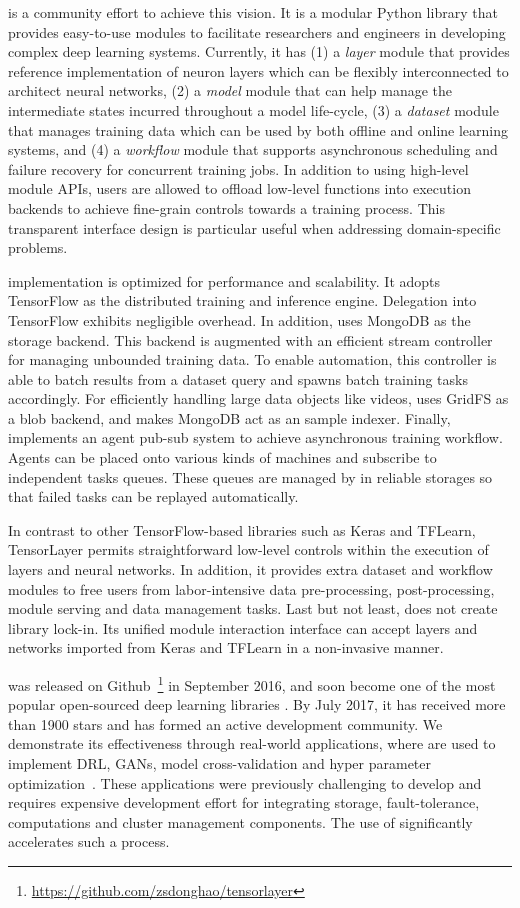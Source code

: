 \tl is a community effort to achieve this vision. It is a modular
Python library that provides easy-to-use modules to facilitate researchers
and engineers in developing complex deep learning systems. Currently, it has 
(1) a \emph{layer} module that provides reference implementation of neuron layers 
which can be flexibly interconnected to architect neural networks,
(2) a \emph{model} module that can help manage the intermediate states incurred throughout a model life-cycle,
(3) a \emph{dataset} module that manages training data which can be used by both offline and online learning systems, 
and (4) a \emph{workflow} module that supports asynchronous scheduling and failure recovery for concurrent training jobs.
In addition to using high-level module APIs, \tl users are allowed to offload low-level functions
into execution backends to achieve fine-grain controls towards a training process. This transparent interface design is 
particular useful when addressing domain-specific problems. 

\tl implementation is optimized for performance and scalability. It adopts TensorFlow as the distributed training and inference engine. 
Delegation into TensorFlow exhibits negligible overhead. In addition, \tl uses MongoDB as the storage backend.
This backend is augmented with an efficient stream controller
for managing unbounded training data.  
To enable automation, this controller is able to 
batch results from a dataset query 
and spawns batch training tasks accordingly. 
For efficiently handling large data objects like videos, \tl uses GridFS as a blob backend, and makes
MongoDB act as an sample indexer. Finally, \tl implements
an agent pub-sub system to achieve asynchronous training workflow. Agents
can be placed onto various kinds of machines and
subscribe to independent tasks queues.
These queues are managed by in reliable storages so that failed tasks can be replayed automatically.

In contrast to other TensorFlow-based libraries such as Keras and TFLearn, 
TensorLayer permits straightforward low-level controls within the execution of layers and neural networks. 
In addition, it provides extra dataset and workflow modules to free users from labor-intensive 
data pre-processing, post-processing, module serving and data management tasks. Last but not least,
\tl does not create library lock-in. Its unified module interaction interface can accept
layers and networks imported from Keras and TFLearn in a non-invasive manner.

\tl was released on Github~\footnote{\url{https://github.com/zsdonghao/tensorlayer}} in September 2016, and soon become one of the most popular 
open-sourced deep learning libraries \cite{dlranking2017}. By July 2017, it has received more than 1900 stars and has formed an 
active development community. We demonstrate its 
effectiveness through real-world applications, where \tl are used to implement
DRL, GANs, model cross-validation and hyper parameter optimization~\cite{bergstra2012random}. These applications were previously challenging 
to develop and requires expensive development effort for integrating storage, fault-tolerance,
computations and cluster management components. The use of \tl significantly accelerates such a process. 

